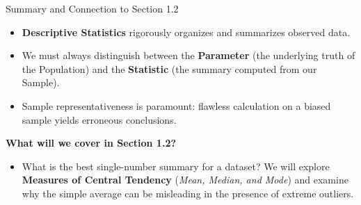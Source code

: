 \documentclass[aspectratio=169,xcolor={dvipsnames,table}]{beamer}
\begin{document}




\begin{frame}{Summary and Connection to Section 1.2}
  \begin{itemize}
    \item \textbf{Descriptive Statistics} rigorously organizes and summarizes observed data. \pause
    \item We must always distinguish between the \textbf{Parameter} (the underlying truth of the Population) and the \textbf{Statistic} (the summary computed from our Sample). \pause
    \item Sample representativeness is paramount: flawless calculation on a biased sample yields erroneous conclusions.
  \end{itemize}

  \vspace{0.6em}
  \pause
  {\large \color{TecAzulOscuro}\textbf{What will we cover in Section 1.2?}}
  \vspace{0.2em}
  \begin{itemize}
    \item What is the best single-number summary for a dataset? We will explore \textbf{Measures of Central Tendency} (\emph{Mean, Median, and Mode}) and examine why the simple average can be misleading in the presence of extreme outliers.
  \end{itemize}
\end{frame}
\end{document}
